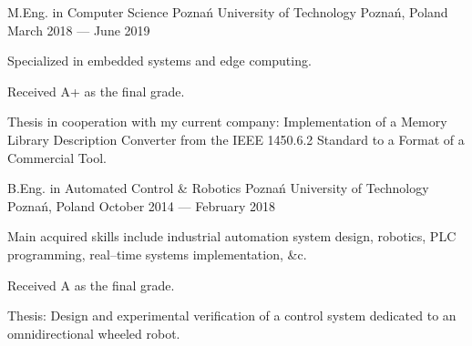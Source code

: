 \documentclass[11pt, a4paper]{awesome-cv}
\begin{document}
\begin{cventries}
  \cventry
    {M.Eng. in Computer Science} %
    {Poznań University of Technology} %
    {Poznań, Poland} %
    {March 2018 --- June 2019} %
    {
      \begin{cvitems} %
      \item {Specialized in embedded systems and edge computing.}
      \item {Received A+ as the final grade.}
      \item {Thesis in cooperation with my current company: Implementation of a Memory Library Description Converter from the IEEE 1450.6.2 Standard to a Format of a Commercial Tool.}
      \end{cvitems}
    }

  \cventry
    {B.Eng. in Automated Control \& Robotics} %
    {Poznań University of Technology} %
    {Poznań, Poland} %
    {October 2014 --- February 2018} %
    {
      \begin{cvitems} %
      \item {Main acquired skills include industrial automation system design, robotics, PLC programming, real--time systems implementation, \&c.}
      \item {Received A as the final grade.}
      \item {Thesis: Design and experimental verification of a control system dedicated to an omnidirectional wheeled robot.}
      \end{cvitems}
    }
\end{cventries}

\end{document}
